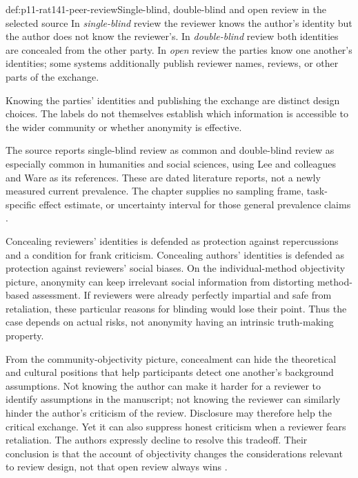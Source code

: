 \begin{hbdefinition}{def:p11-rat141-peer-review}{Single-blind, double-blind and open review in the selected source}
In \emph{single-blind} review the reviewer knows the author's identity
but the author does not know the reviewer's. In \emph{double-blind}
review both identities are concealed from the other party. In
\emph{open} review the parties know one another's identities; some
systems additionally publish reviewer names, reviews, or other parts
of the exchange.

Knowing the parties' identities and publishing the exchange are
distinct design choices. The labels do not themselves establish which
information is accessible to the wider community or whether anonymity
is effective.
\end{hbdefinition}

The source reports single-blind review as common and double-blind
review as especially common in humanities and social sciences, using
Lee and colleagues and Ware as its references. These are dated
literature reports, not a newly measured current prevalence. The
chapter supplies no sampling frame, task-specific effect estimate,
or uncertainty interval for those general prevalence claims
\parencite[p.~752]{AndersenAndersen2021Scientific}.

Concealing reviewers' identities is defended as protection against
repercussions and a condition for frank criticism. Concealing authors'
identities is defended as protection against reviewers' social biases.
On the individual-method objectivity picture, anonymity can keep
irrelevant social information from distorting method-based assessment.
If reviewers were already perfectly impartial and safe from retaliation,
these particular reasons for blinding would lose their point. Thus
the case depends on actual risks, not anonymity having an intrinsic
truth-making property.

From the community-objectivity picture, concealment can hide the
theoretical and cultural positions that help participants detect one
another's background assumptions. Not knowing the author can make
it harder for a reviewer to identify assumptions in the manuscript;
not knowing the reviewer can similarly hinder the author's criticism
of the review. Disclosure may therefore help the critical exchange.
Yet it can also suppress honest criticism when a reviewer fears
retaliation. The authors expressly decline to resolve this tradeoff.
Their conclusion is that the account of objectivity changes the
considerations relevant to review design, not that open review always
wins \parencite[p.~752]{AndersenAndersen2021Scientific}.

